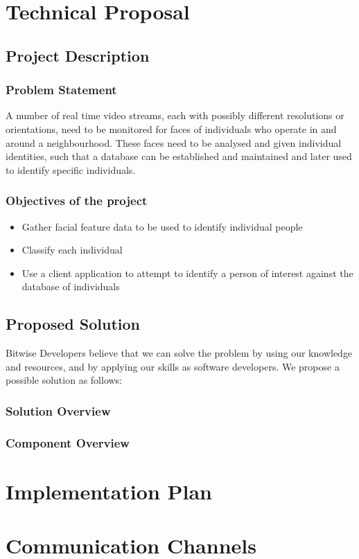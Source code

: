\documentclass[a4paper]{article}
\begin{document}
	\section{Technical Proposal}
	
		\subsection{Project Description}
		
			\subsubsection{Problem Statement}
			
			A number of real time video streams, each with possibly different resolutions or orientations, need to be monitored for
			faces of individuals who operate in and around a neighbourhood. These faces need to be analysed and given individual identities,
			such that a database can be established and maintained and later used to identify specific individuals.
			
			\subsubsection{Objectives of the project}
			
				\begin{itemize}
				
					\item Gather facial feature data to be used to identify individual people
					
					\item Classify each individual
					
					\item Use a client application to attempt to identify a person of interest against the database of individuals
			
				\end{itemize}
			
		\subsection{Proposed Solution}
		
		Bitwise Developers believe that we can solve the problem by using our knowledge and resources, and by applying our skills as software developers.
		We propose a possible solution as follows:
		
			\subsubsection{Solution Overview}
			
			
			
			\subsubsection{Component Overview}
			
	\section{Implementation Plan}
	
	\section{Communication Channels}
\end{document}
